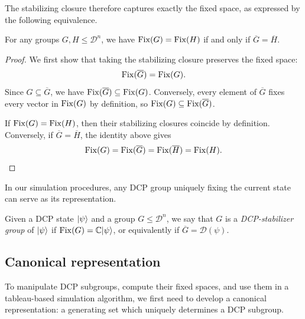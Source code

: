The stabilizing closure therefore captures exactly the fixed space, as expressed by the following equivalence.

\begin{proposition}
    For any groups $G, H \le \mathcal{D}^n$, we have $\operatorname{Fix}(G) = \operatorname{Fix}(H)$ if and only if $\overline{G} = \overline{H}$.
\end{proposition}
\begin{proof}
    We first show that taking the stabilizing closure
    preserves the fixed space:
    \begin{align}
        \operatorname{Fix}(\overline{G})=\operatorname{Fix}(G).
    \end{align}
    Since $G\subseteq\overline{G}$, we have
    $\operatorname{Fix}(\overline{G})\subseteq\operatorname{Fix}(G)$.
    Conversely, every element of $\overline{G}$ fixes every vector in $\operatorname{Fix}(G)$ by definition, so $\operatorname{Fix}(G)\subseteq\operatorname{Fix}(\overline{G})$.

    If $\operatorname{Fix}(G)=\operatorname{Fix}(H)$, then their stabilizing closures
    coincide by definition.
    Conversely, if
    $\overline{G}=\overline{H}$, the identity above gives
    \begin{align}
        \operatorname{Fix}(G)=\operatorname{Fix}(\overline{G})
        =\operatorname{Fix}(\overline{H})=\operatorname{Fix}(H).
    \end{align}
\end{proof}

In our simulation procedures, any DCP group uniquely fixing the current state can serve as its representation.

\begin{definition}\label{def:dcp-stabilizer-group}
    Given a DCP state $|\psi\rangle$ and a group $G \le \mathcal{D}^n$, we say that $G$ is a \textit{DCP-stabilizer group} of $|\psi\rangle$ if $\operatorname{Fix}(G) = \mathbb{C}|\psi\rangle$, or equivalently if $\overline{G} = \mathcal{D}(\psi)$.
\end{definition}

\subsection{Canonical representation}

To manipulate DCP subgroups, compute their fixed spaces, and use them in a tableau-based simulation algorithm, we first need to develop a canonical representation: a generating set which uniquely determines a DCP subgroup.


